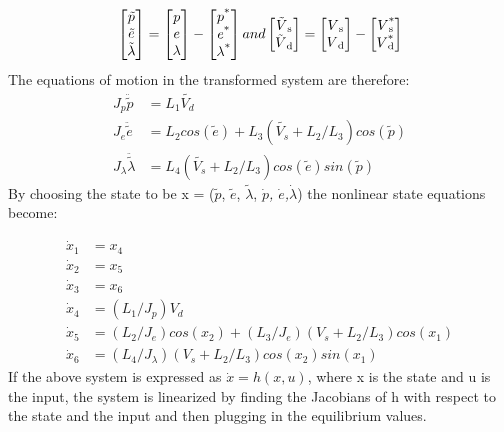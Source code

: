 \begin{equation}
  \begin{bmatrix}
    \tilde{p} \\
    \tilde{e} \\
    \tilde{\lambda}
  \end{bmatrix}
  =
  \begin{bmatrix}
    p \\
    e \\
    \lambda
  \end{bmatrix}
  -
  \begin{bmatrix}
    p\SP{*} \\
    e\SP{*} \\
    \lambda\SP{*}
  \end{bmatrix}
  and
  \begin{bmatrix}
    \tilde{V}\SB{s} \\
    \tilde{V}\SB{d}
  \end{bmatrix}
  =
  \begin{bmatrix}
    V\SB{s} \\
    V\SB{d}
  \end{bmatrix}
  -
  \begin{bmatrix}
    V\SPSB{*}{s} \\
    V\SPSB{*}{d}
  \end{bmatrix}
\end{equation}
The equations of motion in the transformed system are therefore:
\begin{subequations}
  \begin{align}
    J_p\ddot{\tilde{p}} &= L_1\tilde{V_d} \\
    J_e\ddot{\tilde{e}} &= L_2cos(\tilde{e}) + L_3(\tilde{V_s}+L_2/L_3)cos(\tilde{p}) \\
    J_{\lambda}\ddot{\tilde{\lambda}} &= L_4(\tilde{V_s}+L_2/L_3)cos(\tilde{e})sin(\tilde{p})
  \end{align}
\end{subequations}
By choosing the state to be x = ($\tilde{p}$, $\tilde{e}$,
$\tilde{\lambda}$, \textit{$\dot{p}$, $\dot{e}$,$\dot{\lambda}$}) the
nonlinear state equations become:

\begin{subequations}
  \begin{align}
    \dot{x}_1 &= x_4 \\
    \dot{x}_2 &= x_5 \\
    \dot{x}_3 &= x_6 \\
    \dot{x}_4 &= (L_1/J_p) V_d \\
    \dot{x}_5 &= (L_2/J_e)cos(x_2) + (L_3/J_e)(V_s + L_2 / L_3)cos(x_1) \\
    \dot{x}_6 &= (L_4 / J_\lambda) (V_s + L_2 / L_3)cos(x_2)sin(x_1)
  \end{align}
\end{subequations}
If the above system is expressed as $\dot{x} = h(x, u)$, where x is
the state and u is the input, the system is linearized by finding the
Jacobians of h with respect to the state and the input and then
plugging in the equilibrium values.

